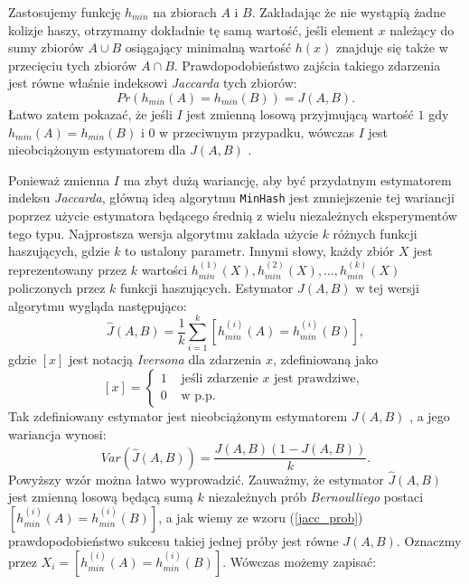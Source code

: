 Zastosujemy funkcję $h_{min}$ na zbiorach $A$ i $B$. Zakładając że nie wystąpią żadne kolizje haszy, otrzymamy dokładnie tę samą wartość, jeśli element $x$ należący do sumy zbiorów $A \cup B$ osiągający minimalną wartość $h(x)$ znajduje się także w przecięciu tych zbiorów $A \cap B$. Prawdopodobieństwo zajścia takiego zdarzenia jest równe właśnie indeksowi \textit{Jaccarda} tych zbiorów:
\begin{equation}
    Pr(h_{min}(A) = h_{min}(B)) = J(A, B).
    \label{jacc_prob}
\end{equation}
Łatwo zatem pokazać, że jeśli $I$ jest zmienną losową przyjmującą wartość $1$ gdy $h_{min}(A) = h_{min}(B)$ i $0$ w przeciwnym przypadku, wówczas $I$ jest nieobciążonym estymatorem dla $J(A, B)$ \cite{minhash}.

Ponieważ zmienna $I$ ma zbyt dużą wariancję, aby być przydatnym estymatorem indeksu \textit{Jaccarda}, główną ideą algorytmu \texttt{MinHash} jest zmniejszenie tej wariancji poprzez użycie estymatora będącego średnią z wielu niezależnych eksperymentów tego typu. Najprostsza wersja algorytmu zakłada użycie $k$ różnych funkcji haszujących, gdzie $k$ to ustalony parametr. Innymi słowy, każdy zbiór $X$ jest reprezentowany przez $k$ wartości $h^{(1)}_{min}(X), h^{(2)}_{min}(X), \ldots, h^{(k)}_{min}(X)$ policzonych przez $k$ funkcji haszujących.
Estymator $J(A, B)$ w tej wersji algorytmu wygląda następująco:
\begin{equation}
    \hat{J}(A, B) = \frac{1}{k}\sum_{i=1}^{k}[h_{min}^{(i)}(A) = h_{min}^{(i)}(B)],
    \label{jacc_est}
\end{equation}
gdzie $[x]$ jest notacją \textit{Iversona} dla zdarzenia $x$, zdefiniowaną jako 
$$[x] = \left\{ \begin{array}{rl}
	1 &\mbox{ jeśli zdarzenie $x$ jest prawdziwe, } \\
	0 &\mbox{ w p.p.}
\end{array} \right.$$ %
Tak zdefiniowany estymator jest nieobciążonym estymatorem $J(A, B)$ \cite{minhash}, a jego wariancja wynosi:
\begin{equation}
    Var(\hat{J}(A,B)) = \frac{J(A, B)(1 - J(A, B))}{k}.
    \label{jacc_var}
\end{equation}
Powyższy wzór można łatwo wyprowadzić. Zauważmy, że estymator $\hat{J}(A, B)$ jest zmienną losową będącą sumą $k$ niezależnych prób \textit{Bernoulliego} postaci $[h_{min}^{(i)}(A) = h_{min}^{(i)}(B)]$, a jak wiemy ze wzoru (\ref{jacc_prob}) prawdopodobieństwo sukcesu takiej jednej próby jest równe $J(A, B)$. Oznaczmy przez $X_i = [h_{min}^{(i)}(A) = h_{min}^{(i)}(B)]$. Wówczas możemy zapisać:
